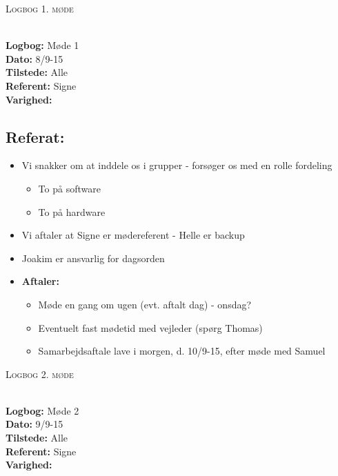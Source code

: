 \documentclass[a4paper,11pt,oneside]{memoir}
\begin{document}

\begin{center} 
\huge{\textsc{Logbog 1. møde}}
\end{center}

\textbf{ }
\\
\textbf{Logbog:} Møde 1
\\
\textbf{Dato:} 8/9-15
\\
\textbf{Tilstede:} Alle
\\
\textbf{Referent:} Signe
\\
\textbf{Varighed:}
\\

\subsection{Referat:}

\begin{itemize}
\item Vi snakker om at inddele os i grupper - forsøger os med en rolle fordeling
\begin{itemize}
\item To på software
\item To på hardware
\end{itemize}
\item Vi aftaler at Signe er mødereferent - Helle er backup
\item Joakim er ansvarlig for dagsorden
\item \textbf{Aftaler:}
\begin{itemize}
\item Møde en gang om ugen (evt. aftalt dag) - onsdag?
\item Eventuelt fast mødetid med vejleder (spørg Thomas)
\item Samarbejdsaftale lave i morgen, d. 10/9-15, efter møde med Samuel

\end{itemize}
\end{itemize}

\newpage


\begin{center} 
\huge{\textsc{Logbog 2. møde}}
\end{center}

\textbf{ }
\\
\textbf{Logbog:} Møde 2
\\
\textbf{Dato:} 9/9-15
\\
\textbf{Tilstede:} Alle
\\
\textbf{Referent:} Signe
\\
\textbf{Varighed:}
\\
\end{document}
